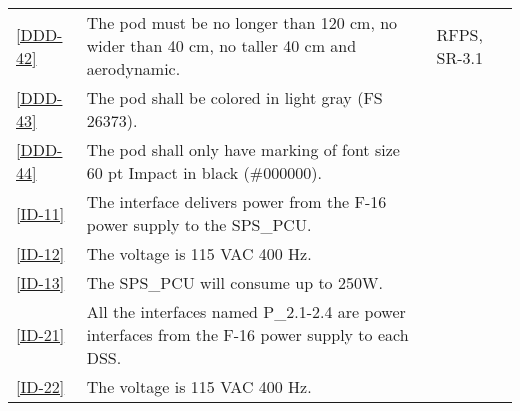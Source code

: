 \documentclass[Main]{subfiles}
\begin{document}
\begin{longtable}{l p{10.4cm} p{1.8cm} }
\ref{DDD-42} & The pod must be no longer than 120 cm, no wider than 40 cm, no taller 40 cm and aerodynamic. & RFPS, SR-3.1\\

\ref{DDD-43} & The pod shall be colored in light gray (FS 26373). & \\

\ref{DDD-44} & The pod shall only have marking of font size 60 pt Impact in black (\#000000). & \\
%
%
%
%
%
%
%
%
%
%
%
%
%
%
%


\ref{ID-11} & The interface delivers power from the F-16 power supply to the SPS\_PCU.& \\

\ref{ID-12} & The voltage is 115 VAC 400 Hz.& \\

\ref{ID-13} & The SPS\_PCU will consume up to 250W. & \\

\ref{ID-21} & All the interfaces named P\_2.1-2.4 are power interfaces from the F-16 power supply to each DSS. & \\

\ref{ID-22} & The voltage is 115 VAC 400 Hz. & \\


\end{longtable}
\end{document}
